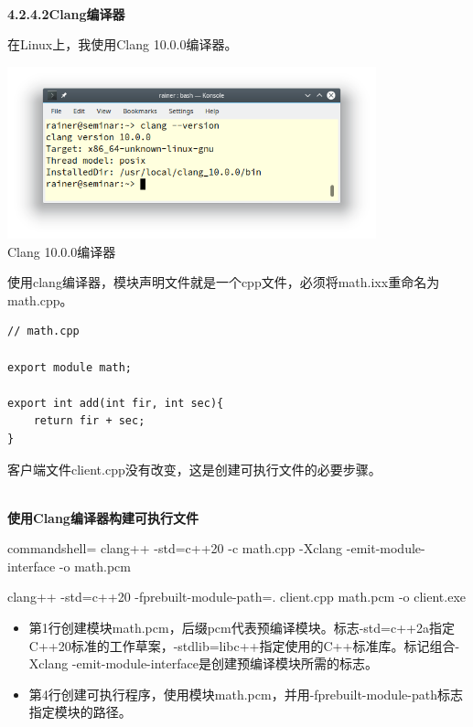 \hspace*{\fill} \\ %
\noindent
\textbf{4.2.4.2\hspace{0.2cm}Clang编译器}

在Linux上，我使用Clang 10.0.0编译器。

\begin{center}
\includegraphics[width=0.8\textwidth]{content/3/chapter4/images/19.png}\\
Clang 10.0.0编译器
\end{center}

使用clang编译器，模块声明文件就是一个cpp文件，必须将math.ixx重命名为math.cpp。

\begin{lstlisting}[style=styleCXX]
// math.cpp

export module math;

export int add(int fir, int sec){
	return fir + sec;
}
\end{lstlisting}

客户端文件client.cpp没有改变，这是创建可执行文件的必要步骤。

\hspace*{\fill} \\ %
\noindent
\textbf{使用Clang编译器构建可执行文件}
\begin{tcblisting}{commandshell={}}
clang++ -std=c++20 -c math.cpp -Xclang -emit-module-interface -o math.pcm

clang++ -std=c++20 -fprebuilt-module-path=. client.cpp math.pcm -o client.exe
\end{tcblisting}

\begin{itemize}
\item 
第1行创建模块math.pcm，后缀pcm代表预编译模块。标志-std=c++2a指定C++20标准的工作草案，-stdlib=libc++指定使用的C++标准库。标记组合-Xclang -emit-module-interface是创建预编译模块所需的标志。

\item 
第4行创建可执行程序，使用模块math.pcm，并用-fprebuilt-module-path标志指定模块的路径。
\end{itemize}

